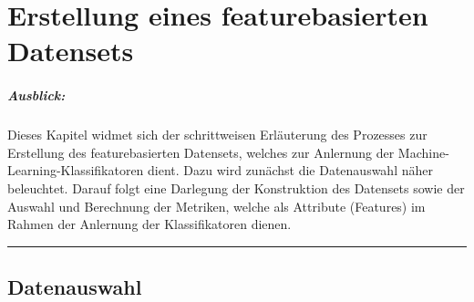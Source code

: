 
\chapter{Erstellung eines featurebasierten Datensets}

\paragraph{Ausblick:}
Dieses Kapitel widmet sich der schrittweisen Erläuterung des Prozesses zur Erstellung des featurebasierten Datensets, welches zur Anlernung der Machine-Learning-Klassifikatoren dient. Dazu wird zunächst die Datenauswahl näher beleuchtet. Darauf folgt eine Darlegung der Konstruktion des Datensets sowie der Auswahl und Berechnung der Metriken, welche als Attribute (Features) im Rahmen der Anlernung der Klassifikatoren dienen.
\\
\hrule

\section{Datenauswahl}

